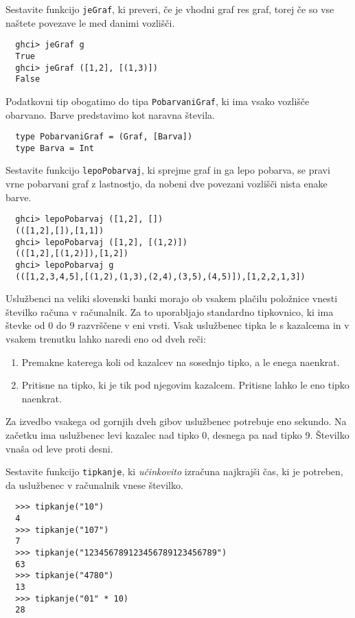 \documentclass[arhiv]{../izpit}
\begin{document}
\podnaloga
  Sestavite funkcijo \texttt{jeGraf}, ki preveri, če je vhodni
  graf res graf, torej če so vse naštete povezave le med danimi vozlišči.
  \begin{verbatim}
  ghci> jeGraf g
  True
  ghci> jeGraf ([1,2], [(1,3)])
  False
  \end{verbatim}

\podnaloga
  Podatkovni tip obogatimo do tipa \texttt{PobarvaniGraf}, ki ima
  vsako vozlišče obarvano. Barve predstavimo kot naravna števila.

  \begin{verbatim}
  type PobarvaniGraf = (Graf, [Barva])
  type Barva = Int
  \end{verbatim}

  Sestavite funkcijo \texttt{lepoPobarvaj}, ki sprejme graf in 
  ga lepo pobarva, se pravi vrne pobarvani graf z lastnostjo, 
  da nobeni dve povezani vozlišči nista enake barve.
  \begin{verbatim}
  ghci> lepoPobarvaj ([1,2], [])
  (([1,2],[]),[1,1])
  ghci> lepoPobarvaj ([1,2], [(1,2)])
  (([1,2],[(1,2)]),[1,2])
  ghci> lepoPobarvaj g
  (([1,2,3,4,5],[(1,2),(1,3),(2,4),(3,5),(4,5)]),[1,2,2,1,3])
  \end{verbatim}


  Uslužbenci na veliki slovenski banki morajo ob vsakem plačilu položnice vnesti številko računa v računalnik.
  Za to uporabljajo standardno tipkovnico, ki ima števke od
  0 do 9 razvrščene v eni vrsti. Vsak uslužbenec tipka le s
  kazalcema in v vsakem trenutku lahko naredi eno od dveh reči:

  \begin{enumerate}
    \item Premakne katerega koli od kazalcev na sosednjo tipko, a
    le enega naenkrat.
    \item Pritisne na tipko, ki je tik pod njegovim kazalcem. Pritisne
    lahko le eno tipko naenkrat.
  \end{enumerate}

 Za izvedbo vsakega od gornjih dveh gibov uslužbenec potrebuje eno sekundo. Na začetku ima uslužbenec levi kazalec nad tipko 0, desnega
 pa nad tipko 9. Številko vnaša od leve proti desni.

 Sestavite funkcijo \texttt{tipkanje}, ki {\em učinkovito}
 izračuna najkrajši čas, ki je potreben, da uslužbenec v
 računalnik vnese številko.

  \begin{verbatim}
  >>> tipkanje("10")
  4
  >>> tipkanje("107")
  7
  >>> tipkanje("123456789123456789123456789")
  63
  >>> tipkanje("4780")
  13
  >>> tipkanje("01" * 10)
  28
  \end{verbatim}
\end{document}
